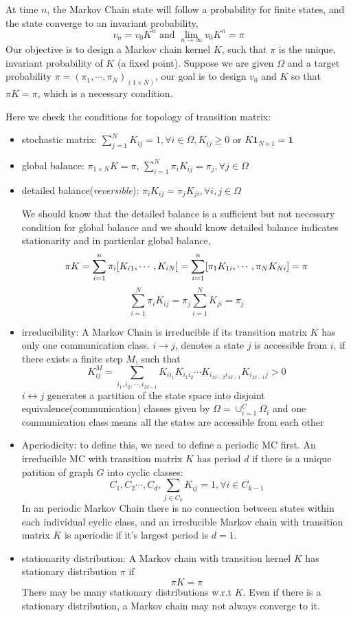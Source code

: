 \documentclass{article}
\begin{document}
At time $n$, the Markov Chain state will follow a probability for finite states, and the state converge to an invariant probability,
\[v_n=v_0K^n \text{ and }\lim_{n\to\infty}v_0K^n=\pi\] 
Our objective is to design a Markov chain kernel $K$, such that $\pi$ is the unique, invariant probability of $K$ (a fixed point). Suppose we are given $\Omega$ and a target probability $\pi = (\pi_1,\cdots ,\pi_N)_{(1\times N)}$, our goal is to design $v_0$ and $K$ so that $\pi K=\pi$, which is a necessary condition.

Here we check the conditions for topology of transition matrix:
\begin{itemize}
  \item stochastic matrix: $\sum_{j=1}^NK_{ij}=1,\forall i \in \Omega, K_{ij}\ge 0$ or $K\bm{1}_{N\times 1}=\bm{1}$
  \item global balance: $\pi_{1\times N} K=\pi$, $\sum_{i=1}^N\pi_iK_{ij}=\pi_j,\forall j \in \Omega$
  \item detailed balance(\textit{reversible}): $\pi_iK_{ij}=\pi_jK_{ji},\forall i,j\in\Omega$

  We should know that the detailed balance is a sufficient but not necessary condition for global balance and we should know detailed balance indicates stationarity and in particular global balance,
  \[\pi K=\sum_{i=1}^{n} \pi_i[K_{i1},\cdots,K_{iN}]=\sum_{i=1}^{n} [\pi_1K_{1i},\cdots,\pi_NK_{Ni}]=\pi\]
  \[\sum_{i=1}^N\pi_iK_{ij}=\pi_j\sum_{i=1}^NK_{ji}=\pi_j\]
  \item irreducibility: A Markov Chain is irreducible if its transition matrix $K$ has only one communication class. $i\to j$, denotes a state $j$ is accessible from $i$, if there exists a finite step $M$, such that \[K^M_{ij}=\sum_{i_1,i_2,\cdots,i_{M-1}}K_{ii_1}K_{i_1i_2}\cdots K_{i_{M-2}i_{M-1}}K_{i_{M-1}j}>0\]
  $i\leftrightarrow j$ generates a partition of the state space into disjoint equivalence(communication) classes given by $\Omega=\cup^C_{i=1}\Omega_i$ and one communication class means all the states are accessible from each other
  \item Aperiodicity: to define this, we need to define a periodic MC first. An irreducible MC with transition matrix $K$ has period $d$ if there is a unique patition of graph $G$ into cyclic classes:
  \[C_1,C_2\cdots,C_d,\sum_{j\in C_k}K_{ij}=1,\forall i\in C_{k-1}\]
  In an periodic Markov Chain there is no connection between states within each individual cyclic class, 
  and an irreducible Markov chain with transition matrix $K$ is aperiodic if it’s largest period is $d = 1$.
  \item stationarity distribution: A Markov chain with transition kernel $K$ has stationary distribution $\pi$ if\[\pi K=\pi\]
  There may be many stationary distributions w.r.t $K$. Even if there is a stationary distribution, a Markov chain may not always converge to it.
\end{itemize}
\end{document}
